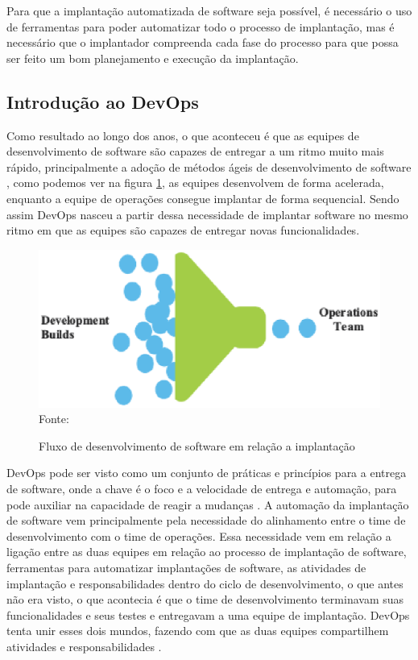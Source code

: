 Para que a implantação automatizada de software seja possível, é necessário o uso
de ferramentas para poder automatizar todo o processo de implantação,
mas é necessário que o implantador compreenda cada fase do processo para que possa ser
feito um bom planejamento e execução da implantação.

\subsection{Introdução ao DevOps}
\label{subsec:DevOps}
Como resultado ao longo dos anos, o que aconteceu é que as equipes de desenvolvimento de software
são capazes de entregar a um ritmo muito mais rápido, principalmente a adoção
de métodos ágeis de desenvolvimento de software \cite{7173368}, como podemos
ver na figura \ref{fig:DevOps}, as equipes desenvolvem de forma acelerada, enquanto
a equipe de operações consegue implantar de forma sequencial. Sendo assim DevOps
nasceu a partir dessa necessidade de implantar software no mesmo ritmo em que
as equipes são capazes de entregar novas funcionalidades.

\begin{figure}[h]
  \centering
  \caption{Fluxo de desenvolvimento de software em relação a implantação}
  \includegraphics[width=1.0\textwidth]
      {figuras/devops.eps}
    Fonte: \cite{7173368}
\label{fig:DevOps}
\end{figure}

DevOps pode ser visto como um conjunto de práticas e princípios para a entrega de software, onde a
chave é o foco e a velocidade de entrega e automação, para pode auxiliar na capacidade
de reagir a mudanças \cite{7173368}. A automação da implantação de software vem
principalmente pela necessidade do alinhamento entre o time de desenvolvimento
com o time de operações. Essa necessidade vem em relação a ligação entre as duas
equipes em relação ao processo de implantação de software, ferramentas para
automatizar implantações de software, as atividades de implantação e responsabilidades
dentro do ciclo de desenvolvimento, o que antes não era visto, o que acontecia é
que o time de desenvolvimento terminavam suas funcionalidades e seus testes e
entregavam a uma equipe de implantação. DevOps tenta unir esses dois mundos,
fazendo com que as duas equipes compartilhem atividades e responsabilidades \cite{6265084}.

